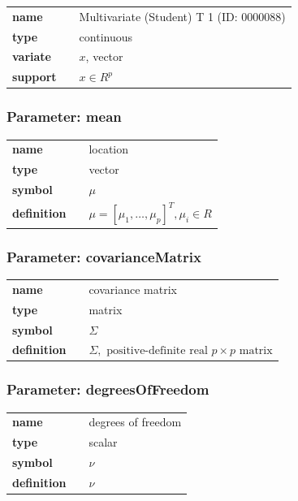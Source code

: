   \bigskip 

\begin{tabular}{p{2cm}cl}
\textbf{name} & & Multivariate (Student) T 1 (ID: 0000088)\\ 
 
\textbf{type} & & continuous \\ 

\textbf{variate} & & $x$, vector \\ 

\textbf{support} & & $x \in R^p$
\end{tabular}


\subsubsection*{Parameter: mean}

\noindent\begin{tabular}{p{2cm}cl}
\textbf{name} & & location \\
\textbf{type} & & vector \\
\textbf{symbol} & & $\mu$  \\
\textbf{definition} & & $\mu = [\mu_1, \dots, \mu_p]^T, \mu_i \in R$
\end{tabular}
\subsubsection*{Parameter: covarianceMatrix}

\noindent\begin{tabular}{p{2cm}cl}
\textbf{name} & & covariance matrix \\
\textbf{type} & & matrix \\
\textbf{symbol} & & $\Sigma$  \\
\textbf{definition} & & $\Sigma, \text{ positive-definite real } p\times p \text{ matrix}$
\end{tabular}
\subsubsection*{Parameter: degreesOfFreedom}

\noindent\begin{tabular}{p{2cm}cl}
\textbf{name} & & degrees of freedom \\
\textbf{type} & & scalar \\
\textbf{symbol} & & $\nu$  \\
\textbf{definition} & & $\nu$
\end{tabular}
